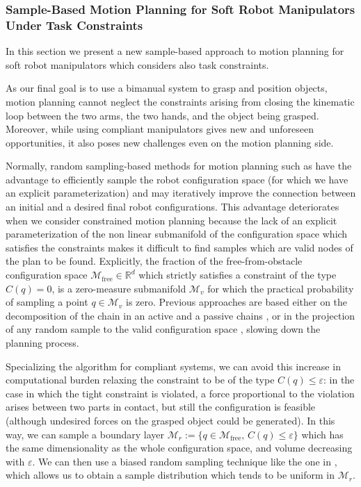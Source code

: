 
\subsubsection{Sample-Based Motion Planning for Soft Robot Manipulators
Under Task Constraints}
\label{sec:SampleBasedMotionPlanningSoftRobots}

In this section we present a new sample-based approach to motion planning for soft robot manipulators which considers also task constraints.

As our final goal is to use a bimanual system to grasp and position objects, motion planning cannot neglect the constraints arising from closing the kinematic loop between the two arms, the two hands, and the object being grasped. Moreover, while using compliant manipulators gives new and unforeseen opportunities, it also poses new challenges even on the motion planning side.

Normally, random sampling-based methods for motion planning such as \cite{kavraki1996probabilistic,lavalle1998rapidly} have the advantage to efficiently sample the robot configuration space (for which we have an explicit parameterization) and may iteratively improve the connection between an initial and a desired final robot configurations.
This advantage deteriorates when we consider constrained motion planning because the lack of an explicit parameterization of the non linear submanifold of the configuration space which satisfies the constraints makes it difficult to find samples which are valid nodes of the plan to be found.
Explicitly, the fraction of the free-from-obstacle configuration space $ \mathcal{M}_{\text{free}} \in \mathbb{R}^{d} $ which strictly satisfies a constraint of the type $ C(q) = 0 $, is a zero-measure submanifold $ \mathcal{M}_{v} $ for which the practical probability of sampling a point $ q \in \mathcal{M}_{v} $ is zero.
Previous approaches are based either on the decomposition of the chain in an active and a passive chains \cite{cortes2002random}, or in the projection of any random sample to the valid configuration space \cite{stilman2010global,berenson2011constrained}, slowing down the planning process.

Specializing the algorithm for compliant systems, we can avoid this increase in computational burden relaxing the constraint to be of the type $ C(q) \leq \varepsilon $: in the case in which the tight constraint is violated, a force proportional to the violation arises between two parts in contact, but still the configuration is feasible (although undesired forces on the grasped object could be generated).
In this way, we can sample a boundary layer $ \mathcal{M}_{r} := \{q \in \mathcal{M}_{\text{free}},\,C(q)\leq \varepsilon \} $ which has the same dimensionality as the whole configuration space, and volume decreasing with $ \varepsilon $.
We can then use a biased random sampling technique like the one in \cite{bialkowski2013free}, which allows us to obtain a sample distribution which tends to be uniform in $ \mathcal{M}_{r} $.

